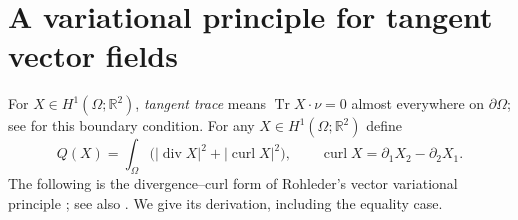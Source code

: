 \section{A variational principle for tangent vector fields}\label{sec:vector-fields}

For $X\in H^1(\Omega;\mathbb R^2)$, \emph{tangent trace} means
$\operatorname{Tr}X\cdot\nu=0$ almost everywhere on $\partial\Omega$;
see \cite[Theorem 1.1, p.~2]{Rohleder} for this boundary condition.
For any $X\in H^1(\Omega;\mathbb R^2)$ define
\[
 Q(X)=\int_\Omega\bigl(|\operatorname{div}X|^2
                         +|\operatorname{curl}X|^2\bigr),
 \qquad \operatorname{curl}X=\partial_1X_2-\partial_2X_1.
\]
The following is the divergence--curl form of Rohleder's vector
variational principle \cite[Theorem 1.1]{Rohleder}; see also \cite{Roh24}.
We give its derivation,
including the equality case.

